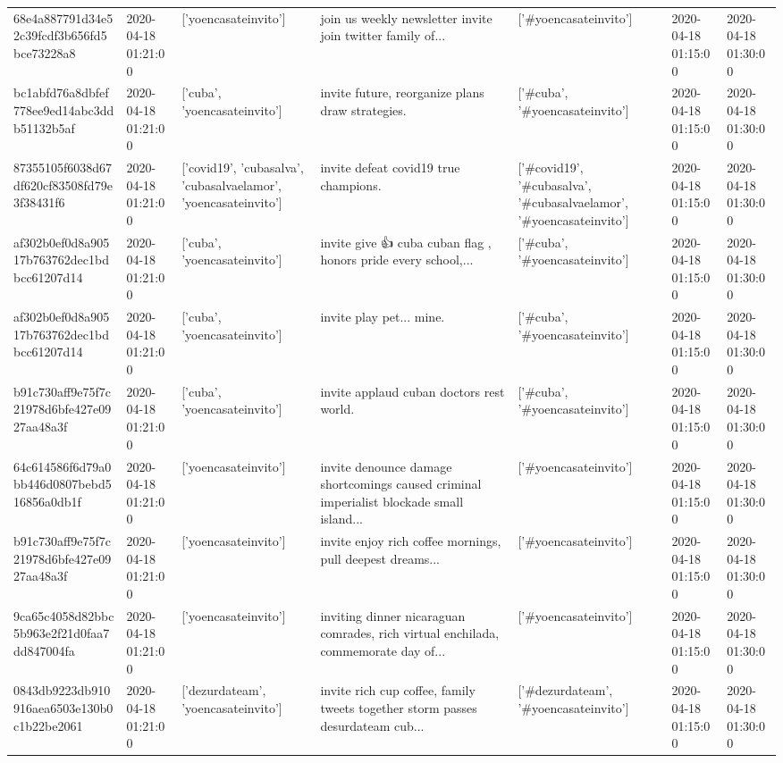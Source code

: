 \begin{tabular}{lllllll}
68e4a887791d34e52c39fcdf3b656fd5bce73228a8 & 2020-04-18 01:21:00 & ['yoencasateinvito'] & join us weekly newsletter invite join twitter family of... & ['#yoencasateinvito'] & 2020-04-18 01:15:00 & 2020-04-18 01:30:00 \\
bc1abfd76a8dbfef778ee9ed14abc3ddb51132b5af & 2020-04-18 01:21:00 & ['cuba', 'yoencasateinvito'] & invite future, reorganize plans draw strategies. & ['#cuba', '#yoencasateinvito'] & 2020-04-18 01:15:00 & 2020-04-18 01:30:00 \\
87355105f6038d67df620cf83508fd79e3f38431f6 & 2020-04-18 01:21:00 & ['covid19', 'cubasalva', 'cubasalvaelamor', 'yoencasateinvito'] & invite defeat covid19 true champions. & ['#covid19', '#cubasalva', '#cubasalvaelamor', '#yoencasateinvito'] & 2020-04-18 01:15:00 & 2020-04-18 01:30:00 \\
af302b0ef0d8a90517b763762dec1bdbcc61207d14 & 2020-04-18 01:21:00 & ['cuba', 'yoencasateinvito'] & invite give 👍 cuba cuban flag , honors pride every school,... & ['#cuba', '#yoencasateinvito'] & 2020-04-18 01:15:00 & 2020-04-18 01:30:00 \\
af302b0ef0d8a90517b763762dec1bdbcc61207d14 & 2020-04-18 01:21:00 & ['cuba', 'yoencasateinvito'] & invite play pet... mine. & ['#cuba', '#yoencasateinvito'] & 2020-04-18 01:15:00 & 2020-04-18 01:30:00 \\
b91c730aff9e75f7c21978d6bfe427e0927aa48a3f & 2020-04-18 01:21:00 & ['cuba', 'yoencasateinvito'] & invite applaud cuban doctors rest world. & ['#cuba', '#yoencasateinvito'] & 2020-04-18 01:15:00 & 2020-04-18 01:30:00 \\
64c614586f6d79a0bb446d0807bebd516856a0db1f & 2020-04-18 01:21:00 & ['yoencasateinvito'] & invite denounce damage shortcomings caused criminal imperialist blockade small island... & ['#yoencasateinvito'] & 2020-04-18 01:15:00 & 2020-04-18 01:30:00 \\
b91c730aff9e75f7c21978d6bfe427e0927aa48a3f & 2020-04-18 01:21:00 & ['yoencasateinvito'] & invite enjoy rich coffee mornings, pull deepest dreams... & ['#yoencasateinvito'] & 2020-04-18 01:15:00 & 2020-04-18 01:30:00 \\
9ca65c4058d82bbc5b963e2f21d0faa7dd847004fa & 2020-04-18 01:21:00 & ['yoencasateinvito'] & inviting dinner nicaraguan comrades, rich virtual enchilada, commemorate day of... & ['#yoencasateinvito'] & 2020-04-18 01:15:00 & 2020-04-18 01:30:00 \\
0843db9223db910916aea6503e130b0c1b22be2061 & 2020-04-18 01:21:00 & ['dezurdateam', 'yoencasateinvito'] & invite rich cup coffee, family tweets together storm passes desurdateam cub... & ['#dezurdateam', '#yoencasateinvito'] & 2020-04-18 01:15:00 & 2020-04-18 01:30:00 \\

\end{tabular}
